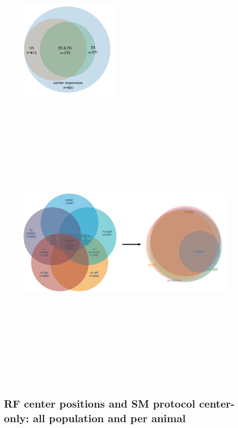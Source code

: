 \begin{figure}[H] \centering \includegraphics[width=5cm,height=5cm,keepaspectratio]{Figures/7.Results/data/centerOSDS.png} 
\end{figure}

\begin{figure}[H] \centering \includegraphics[width=15cm,height=15cm,keepaspectratio]{Figures/7.Results/data/SMdata.png} 
\end{figure}

\subsection{RF center positions and SM protocol center-only: all population and per animal}

